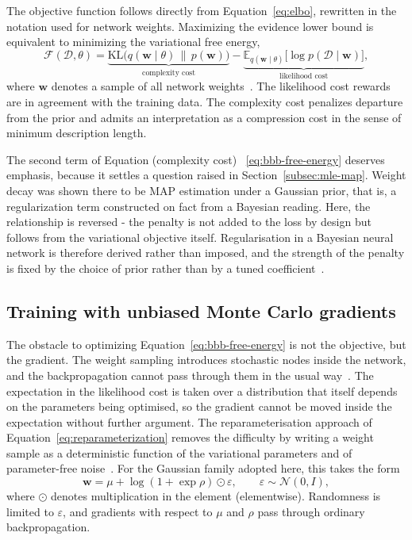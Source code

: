 The objective function follows directly from Equation~\eqref{eq:elbo}, rewritten in
the notation used for network weights. Maximizing the evidence lower bound is
equivalent to minimizing the variational free energy,
\begin{equation}
    \mathcal{F}(\mathcal{D}, \theta)
    = \underbrace{\mathrm{KL}\bigl(q(\mathbf{w} \mid \theta) \,\|\, p(\mathbf{w})\bigr)}_{\text{complexity cost}}
      - \underbrace{\mathbb{E}_{q(\mathbf{w} \mid \theta)}
        \bigl[\log p(\mathcal{D} \mid \mathbf{w})\bigr]}_{\text{likelihood cost}} ,
    \label{eq:bbb-free-energy}
\end{equation}
%
where $\mathbf{w}$ denotes a sample of all network weights~\cite{blundell2015}. The
likelihood cost rewards are in agreement with the training data. The complexity cost
penalizes departure from the prior and admits an interpretation as a compression
cost in the sense of minimum description length.

The second term of Equation (complexity cost) ~\eqref{eq:bbb-free-energy} deserves emphasis, because it settles a question raised in Section~\ref{subsec:mle-map}. Weight decay was shown
there to be MAP estimation under a Gaussian prior, that is, a regularization term
constructed on fact from a Bayesian reading. Here, the relationship is reversed - the penalty is not added to the loss by design but follows from the variational objective itself. Regularisation in a Bayesian neural network is therefore derived rather than imposed, and the strength of the penalty is fixed by the choice of prior rather than by a tuned coefficient~\cite{blundell2015}.

\subsection{Training with unbiased Monte Carlo gradients}
\label{subsec:bbb-training}

The obstacle to optimizing Equation~\eqref{eq:bbb-free-energy} is not the objective, but the gradient. The weight sampling introduces stochastic nodes inside the network, and the backpropagation cannot pass through them in the usual way~\cite{jospin2022}. The expectation in the likelihood cost is taken over a distribution that itself depends on the parameters being optimised, so the gradient  cannot be moved inside the expectation without further argument. The
reparameterisation approach of Equation~\eqref{eq:reparameterization} removes the difficulty by writing a weight sample as a deterministic function of the variational parameters and of parameter-free noise~\cite{kingma2014}. 
For the Gaussian family adopted here, this takes the form
%
\begin{equation}
    \mathbf{w} = \mu + \log\!\left(1 + \exp \rho\right) \odot \varepsilon ,
    \qquad \varepsilon \sim \mathcal{N}(0, I) ,
    \label{eq:bbb-reparameterisation}
\end{equation}
%
where $\odot$ denotes multiplication in the element (elementwise). Randomness is limited to
$\varepsilon$, and gradients with respect to $\mu$ and $\rho$ pass through ordinary
backpropagation.


